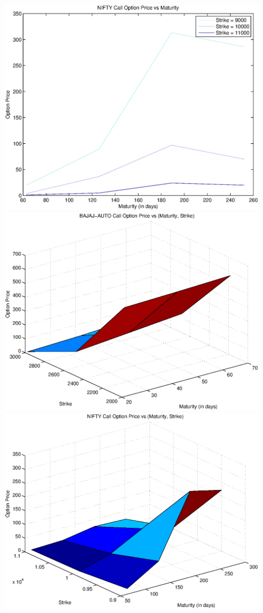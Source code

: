 \documentclass{article}
\begin{document}
\includegraphics[width=\textwidth]{NIFTY_Call_Option_Price_vs_Maturity} \\
\includegraphics[width=\textwidth]{BAJAJ-AUTO_Call_Option_Price_vs_(Maturity,_Strike)} \\  
\includegraphics[width=\textwidth]{NIFTY_Call_Option_Price_vs_(Maturity,_Strike)} \\
\end{document}
